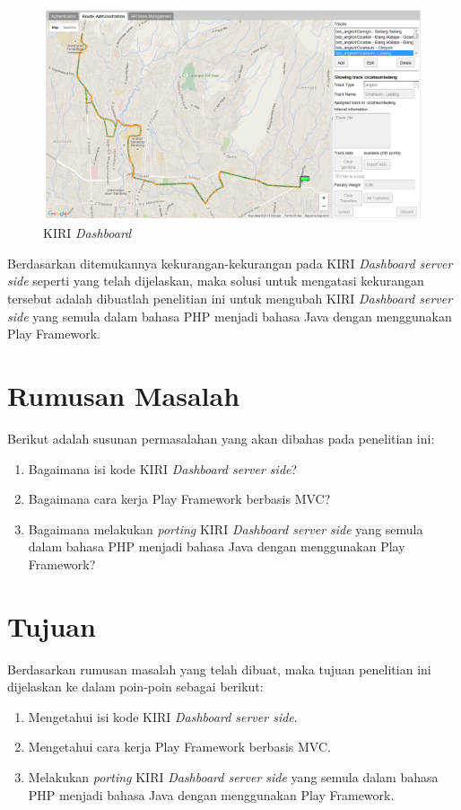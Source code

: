 \begin{figure}[htbp]
	\centering
		\includegraphics[scale=0.35]{Gambar/1_kiridashboard.png}
	\caption{KIRI \textit{Dashboard}\cite{devkiritravel}}
	\label{fig:1_kiridashboard}
\end{figure}

Berdasarkan ditemukannya kekurangan-kekurangan pada KIRI \textit{Dashboard server side} seperti yang telah dijelaskan, maka solusi untuk mengatasi kekurangan tersebut adalah dibuatlah penelitian ini untuk mengubah KIRI \textit{Dashboard server side} yang semula dalam bahasa PHP menjadi bahasa Java dengan menggunakan Play Framework.

\section{Rumusan Masalah}
\label{sec:rumusan_masalah}
Berikut adalah susunan permasalahan yang akan dibahas pada penelitian ini:
	\begin{enumerate}
		\item Bagaimana isi kode KIRI \textit{Dashboard server side}?
		\item Bagaimana cara kerja Play Framework berbasis MVC?
		\item Bagaimana melakukan \textit{porting} KIRI \textit{Dashboard server side} yang semula dalam bahasa PHP menjadi bahasa Java dengan menggunakan Play Framework?
	\end{enumerate}
	
\section{Tujuan}
\label{sec:tujuan}
Berdasarkan rumusan masalah yang telah dibuat, maka tujuan penelitian ini dijelaskan ke dalam poin-poin sebagai berikut:
	\begin{enumerate}
		\item Mengetahui isi kode KIRI \textit{Dashboard server side}.
		\item Mengetahui cara kerja Play Framework berbasis MVC.
		\item Melakukan \textit{porting} KIRI \textit{Dashboard server side} yang semula dalam bahasa PHP menjadi bahasa Java dengan menggunakan Play Framework.
	\end{enumerate}
	
